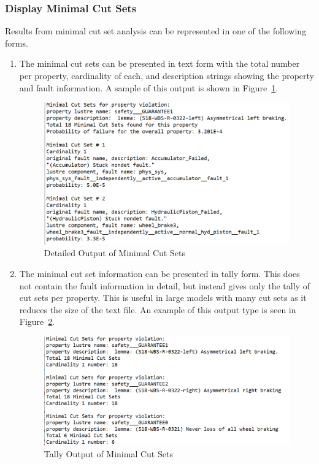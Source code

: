 \subsubsection{Display Minimal Cut Sets}
Results from minimal cut set analysis can be represented in one of the following forms. 
\begin{enumerate}
\item The minimal cut sets can be presented in text form with the total number per property, cardinality of each, and description strings showing the property and fault information. A sample of this output is shown in Figure~\ref{fig:detailedMCS}. 
\begin{figure}[htbp]
	\hspace*{-2cm}
	\vspace{-0.1in} 
	\begin{center}
		\includegraphics[scale=0.7]{images/mcs_detailed.png}
	\caption{Detailed Output of Minimal Cut Sets}
		\label{fig:detailedMCS}
	\end{center}
\end{figure}

\item The minimal cut set information can be presented in tally form. This does not contain the fault information in detail, but instead gives only the tally of cut sets per property. This is useful in large models with many cut sets as it reduces the size of the text file. An example of this output type is seen in Figure~\ref{fig:tallyMCS}.
\begin{figure}[htbp]
	\hspace*{-2cm}
	\vspace{-0.1in} 
	\begin{center}
		\includegraphics[scale=0.7]{images/mcs_tally.png}
	\caption{Tally Output of Minimal Cut Sets}
		\label{fig:tallyMCS}
	\end{center}
\end{figure}


\end{enumerate}
